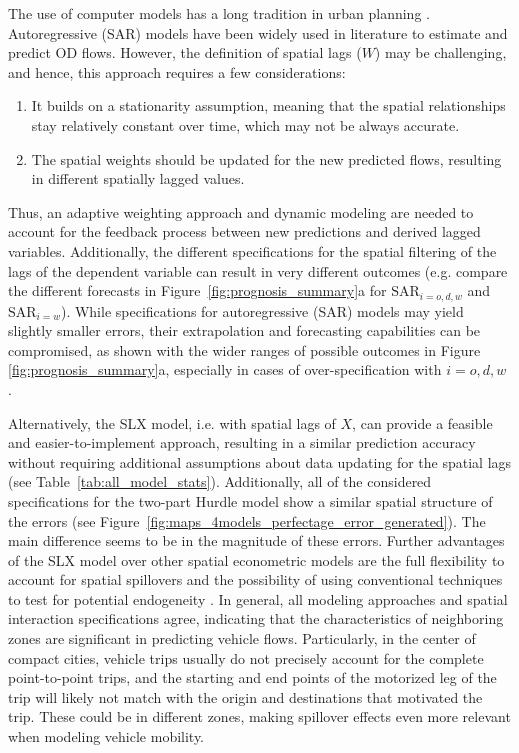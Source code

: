The use of computer models has a long tradition in urban planning \citep{Wegener2021Land-UseModels}. Autoregressive (SAR) models have been widely used in literature to estimate and predict OD flows. However, the definition of spatial lags ($W$) may be challenging, and hence, this approach requires a few considerations:
\begin{enumerate}
    \item It builds on a stationarity assumption, meaning that the spatial relationships stay relatively constant over time, which may not be always accurate. 
    \item The spatial weights should be updated for the new predicted flows, resulting in different spatially lagged values. 
\end{enumerate}
Thus, an adaptive weighting approach and dynamic modeling are needed to account for the feedback process between new predictions and derived lagged variables. Additionally, the different specifications for the spatial filtering of the lags of the dependent variable can result in very different outcomes (e.g. compare the different forecasts in Figure~\ref{fig:prognosis_summary}a for $\text{SAR}_{i=o,d,w}$ and $\text{SAR}_{i=w}$). While specifications for autoregressive (SAR) models may yield slightly smaller errors, their extrapolation and forecasting capabilities can be compromised, as shown with the wider ranges of possible outcomes in Figure \ref{fig:prognosis_summary}a, especially in cases of over-specification with $i=o,d,w$ \citep{Griffith2020SomeModels}.

Alternatively, the SLX model, i.e. with spatial lags of $X$,  can provide a feasible and easier-to-implement approach, resulting in a similar prediction accuracy without requiring additional assumptions about data updating for the spatial lags (see Table~\ref{tab:all_model_stats}). Additionally, all of the considered specifications for the two-part Hurdle model show a similar spatial structure of the errors (see Figure~\ref{fig:maps_4models_perfectage_error_generated}). The main difference seems to be in the magnitude of these errors. Further advantages of the SLX model over other spatial econometric models are the full flexibility to account for spatial spillovers and the possibility of using conventional techniques to test for potential endogeneity \citep{Elhorst2022TheBar}. In general, all modeling approaches and spatial interaction specifications agree, indicating that the characteristics of neighboring zones are significant in predicting vehicle flows. 
Particularly, in the center of compact cities, vehicle trips usually do not precisely account for the complete point-to-point trips, and the starting and end points of the motorized leg of the trip will likely not match with the origin and destinations that motivated the trip. These could be in different zones, making spillover effects even more relevant when modeling vehicle mobility.

